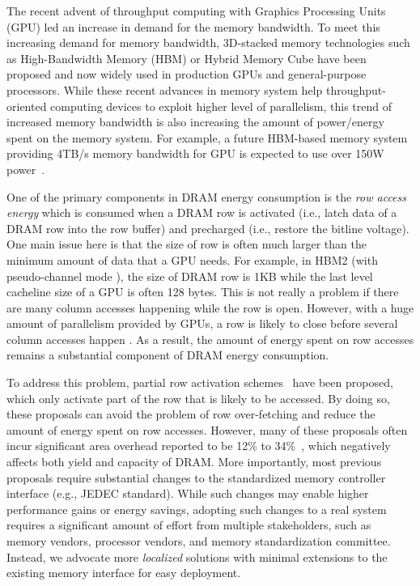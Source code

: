 The recent advent of throughput computing with Graphics Processing Units (GPU) led an increase in demand for the memory bandwidth. To meet this increasing demand for memory bandwidth, 3D-stacked memory technologies such as High-Bandwidth Memory (HBM)  or Hybrid Memory Cube  have been proposed and now widely used in production GPUs and general-purpose processors. While these recent advances in memory system help throughput-oriented computing devices to exploit higher level of parallelism, this trend of increased memory bandwidth is also increasing the amount of power/energy spent on the memory system. For example, a future HBM-based memory system providing 4TB/s memory bandwidth for GPU is expected to use over 150W power~. 

One of the primary components in DRAM energy consumption is the {\it row access energy} which is consumed when a DRAM row is activated (i.e., latch data of a DRAM row into the row buffer) and precharged (i.e., restore the bitline voltage). One main issue here is that the size of row is often much larger than the minimum amount of data that a GPU needs. For example, in HBM2 (with pseudo-channel mode ), the size of DRAM row is 1KB while the last level cacheline size of a GPU is often 128 bytes. This is not really a problem if there are many column accesses happening while the row is open. However, with a huge amount of parallelism provided by GPUs, a row is likely to close before several column accesses happen . As a result, the amount of energy spent on row accesses remains a substantial component of DRAM energy consumption. 

To address this problem, partial row activation schemes~ have been proposed, which only activate part of the row that is likely to be accessed. By doing so, these proposals can avoid the problem of row over-fetching and reduce the amount of energy spent on row accesses. However, many of these proposals often incur significant area overhead reported to be 12\% to 34\%~, which negatively affects both yield and capacity of DRAM. More importantly, most previous proposals require substantial changes to the standardized memory controller interface (e.g., JEDEC standard). While such changes may enable higher performance gains or energy savings, adopting such changes to a real system requires a significant amount of effort from multiple stakeholders, such as memory vendors, processor vendors, and memory standardization committee. Instead, we advocate more \emph{localized} solutions with minimal extensions to the existing memory interface for easy deployment.

